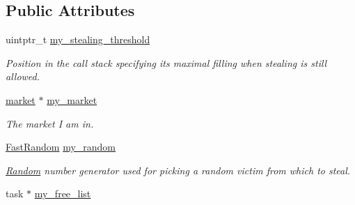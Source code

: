 \subsection*{Public Attributes}
\begin{DoxyCompactItemize}
\item 
\hypertarget{classtbb_1_1internal_1_1generic__scheduler_ade9f23ce97db8725a9c3718e76aa682d}{}uintptr\+\_\+t \hyperlink{classtbb_1_1internal_1_1generic__scheduler_ade9f23ce97db8725a9c3718e76aa682d}{my\+\_\+stealing\+\_\+threshold}\label{classtbb_1_1internal_1_1generic__scheduler_ade9f23ce97db8725a9c3718e76aa682d}

\begin{DoxyCompactList}\small\item\em Position in the call stack specifying its maximal filling when stealing is still allowed. \end{DoxyCompactList}\item 
\hypertarget{classtbb_1_1internal_1_1generic__scheduler_ac652e4a610353888a31352e678955e1b}{}\hyperlink{classtbb_1_1internal_1_1market}{market} $\ast$ \hyperlink{classtbb_1_1internal_1_1generic__scheduler_ac652e4a610353888a31352e678955e1b}{my\+\_\+market}\label{classtbb_1_1internal_1_1generic__scheduler_ac652e4a610353888a31352e678955e1b}

\begin{DoxyCompactList}\small\item\em The market I am in. \end{DoxyCompactList}\item 
\hypertarget{classtbb_1_1internal_1_1generic__scheduler_aee56a8b51b71d3f96f9c8cacf00fe845}{}\hyperlink{classtbb_1_1internal_1_1FastRandom}{Fast\+Random} \hyperlink{classtbb_1_1internal_1_1generic__scheduler_aee56a8b51b71d3f96f9c8cacf00fe845}{my\+\_\+random}\label{classtbb_1_1internal_1_1generic__scheduler_aee56a8b51b71d3f96f9c8cacf00fe845}

\begin{DoxyCompactList}\small\item\em \hyperlink{classRandom}{Random} number generator used for picking a random victim from which to steal. \end{DoxyCompactList}\item 
\hypertarget{classtbb_1_1internal_1_1generic__scheduler_a52ed26dede8410a72f37bce24cb26239}{}task $\ast$ \hyperlink{classtbb_1_1internal_1_1generic__scheduler_a52ed26dede8410a72f37bce24cb26239}{my\+\_\+free\+\_\+list}\label{classtbb_1_1internal_1_1generic__scheduler_a52ed26dede8410a72f37bce24cb26239}


\end{DoxyCompactItemize}
